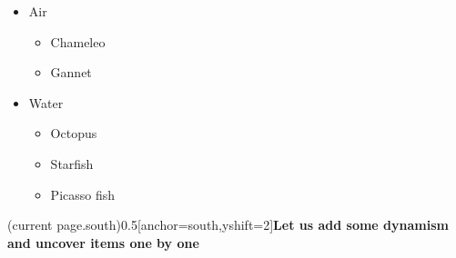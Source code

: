 
\begin{itemize}
\item
Air
\begin{itemize}
\item
Chameleo
\item
Gannet
\end{itemize}
\item
Water
\begin{itemize}
\item
Octopus
\item
Starfish
\item
Picasso fish
\end{itemize}
\end{itemize}
(current page.south){0.5\textwidth}[anchor=south,yshift=2\baselineskip]{\bfseries Let us add some dynamism and uncover items one by one}%
